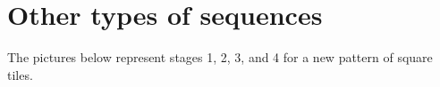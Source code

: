 \section{Other types of sequences}
\label{sec:otherseq}

\begin{boxedexplore}
The pictures below represent stages 1, 2, 3, and 4 for a new pattern of square tiles.



\end{boxedexplore}
